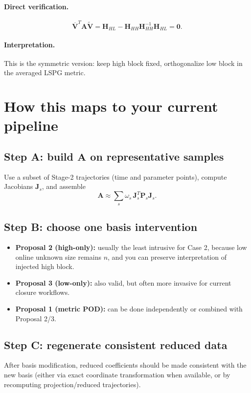 \documentclass[11pt]{article}
\begin{document}
\paragraph{Direct verification.}
\[
\overline{\mathbf V}^T\mathbf A\widetilde{\mathbf V}
=
\mathbf H_{HL}-\mathbf H_{HH}\mathbf H_{HH}^{-1}\mathbf H_{HL}
=
\mathbf0.
\]

\paragraph{Interpretation.}
This is the symmetric version: keep high block fixed, orthogonalize low block in the averaged LSPG metric.

\section{How this maps to your current pipeline}
\subsection*{Step A: build $\mathbf A$ on representative samples}
Use a subset of Stage-2 trajectories (time and parameter points), compute Jacobians $\mathbf J_s$, and assemble
\[
\mathbf A\approx \sum_s \omega_s\,\mathbf J_s^T\mathbf P_s\mathbf J_s.
\]

\subsection*{Step B: choose one basis intervention}
\begin{itemize}[leftmargin=1.5em]
\item \textbf{Proposal 2 (high-only):} usually the least intrusive for Case 2, because low online unknown size remains $n$, and you can preserve interpretation of injected high block.
\item \textbf{Proposal 3 (low-only):} also valid, but often more invasive for current closure workflows.
\item \textbf{Proposal 1 (metric POD):} can be done independently or combined with Proposal 2/3.
\end{itemize}

\subsection*{Step C: regenerate consistent reduced data}
After basis modification, reduced coefficients should be made consistent with the new basis (either via exact coordinate transformation when available, or by recomputing projection/reduced trajectories).
\end{document}
